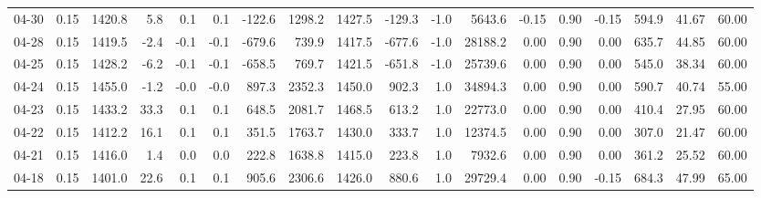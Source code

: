 \begin{threeparttable}
{\begin{tabular}{lrrrrrrrrrrrrrrrrr}
  04-30 &     0.15 & 1420.8 &               5.8 &               0.1 &                0.1 &             -122.6 &  1298.2 & 1427.5 &     -129.3 &                     -1.0 &              5643.6 &      -0.15 &      0.90 &          -0.15 &            594.9 &           41.67 &                  60.00 \\
  04-28 &     0.15 & 1419.5 &              -2.4 &              -0.1 &               -0.1 &             -679.6 &   739.9 & 1417.5 &     -677.6 &                     -1.0 &             28188.2 &       0.00 &      0.90 &           0.00 &            635.7 &           44.85 &                  60.00 \\
  04-25 &     0.15 & 1428.2 &              -6.2 &              -0.1 &               -0.1 &             -658.5 &   769.7 & 1421.5 &     -651.8 &                     -1.0 &             25739.6 &       0.00 &      0.90 &           0.00 &            545.0 &           38.34 &                  60.00 \\
  04-24 &     0.15 & 1455.0 &              -1.2 &              -0.0 &               -0.0 &              897.3 &  2352.3 & 1450.0 &      902.3 &                      1.0 &             34894.3 &       0.00 &      0.90 &           0.00 &            590.7 &           40.74 &                  55.00 \\
  04-23 &     0.15 & 1433.2 &              33.3 &               0.1 &                0.1 &              648.5 &  2081.7 & 1468.5 &      613.2 &                      1.0 &             22773.0 &       0.00 &      0.90 &           0.00 &            410.4 &           27.95 &                  60.00 \\
  04-22 &     0.15 & 1412.2 &              16.1 &               0.1 &                0.1 &              351.5 &  1763.7 & 1430.0 &      333.7 &                      1.0 &             12374.5 &       0.00 &      0.90 &           0.00 &            307.0 &           21.47 &                  60.00 \\
  04-21 &     0.15 & 1416.0 &               1.4 &               0.0 &                0.0 &              222.8 &  1638.8 & 1415.0 &      223.8 &                      1.0 &              7932.6 &       0.00 &      0.90 &           0.00 &            361.2 &           25.52 &                  60.00 \\
  04-18 &     0.15 & 1401.0 &              22.6 &               0.1 &                0.1 &              905.6 &  2306.6 & 1426.0 &      880.6 &                      1.0 &             29729.4 &       0.00 &      0.90 &          -0.15 &            684.3 &           47.99 &                  65.00 \\

\end{tabular}}
\end{threeparttable}
